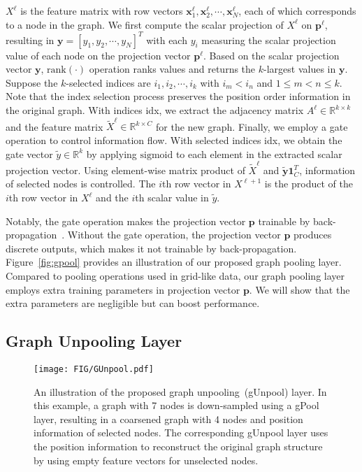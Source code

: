 \documentclass{article}
\begin{document}
$X^{\ell}$ is the feature matrix with row vectors $\mathbf
x^{\ell}_1, \mathbf x^{\ell}_2, \cdots, \mathbf x^{\ell}_N$, each of
which corresponds to a node in the graph. We first compute the
scalar projection of $X^{\ell}$ on $\mathbf{p}^{\ell}$, resulting in
$\mathbf y = [ y_1, y_2, \cdots, y_N ]^T$ with each $y_i$ measuring
the scalar projection value of each node on the projection vector
$\mathbf p^{\ell}$. Based on the scalar projection vector $\mathbf
y$, $\mbox{rank}(\cdot)$ operation ranks values and returns the
$k$-largest values in $\mathbf y$. Suppose the $k$-selected indices
are $i_1, i_2, \cdots, i_k $ with $i_m < i_n$ and $1 \le m < n \le
k$. Note that the index selection process preserves the position
order information in the original graph. With indices idx, we
extract the adjacency matrix $A^{\ell} \in \mathbb{R}^{k\times k}$
and the feature matrix $\tilde X^{\ell} \in \mathbb{R}^{k \times C}$
for the new graph. Finally, we employ a gate operation to control
information flow. With selected indices idx, we obtain the gate
vector $\tilde y \in \mathbb{R}^k$ by applying $\mbox{sigmoid}$ to each
element in the extracted scalar projection vector. Using
element-wise matrix product of $\tilde X^{\ell}$ and $\mathbf{\tilde
y} \mathbf 1^T_C$, information of selected nodes is controlled. The
$i$th row vector in $X^{\ell+1}$ is the product of the $i$th row
vector in $X^{\ell}$ and the $i$th scalar value in $\tilde y$.

Notably, the gate operation makes the projection vector $\mathbf p$
trainable by back-propagation~\citep{lecun2012efficient}. Without the
gate operation, the projection vector $\mathbf p$ produces discrete
outputs, which makes it not trainable by back-propagation.
Figure~\ref{fig:gpool} provides an illustration of our proposed
graph pooling layer. Compared to pooling operations used in
grid-like data, our graph pooling layer employs extra training
parameters in projection vector $\mathbf p$. We will show that the
extra parameters are negligible but can boost performance.

\subsection{Graph Unpooling Layer}

\begin{figure*}[t]  \centering
\texttt{[image: FIG/GUnpool.pdf]}
\caption{An illustration of the proposed graph unpooling~(gUnpool)
layer. In this example, a graph with 7 nodes is down-sampled using a
gPool layer, resulting in a coarsened graph with 4 nodes and
position information of selected nodes. The corresponding gUnpool
layer uses the position information to reconstruct the original
graph structure by using empty feature vectors for unselected
nodes.} \label{fig:gunpool} \end{figure*}
\end{document}
